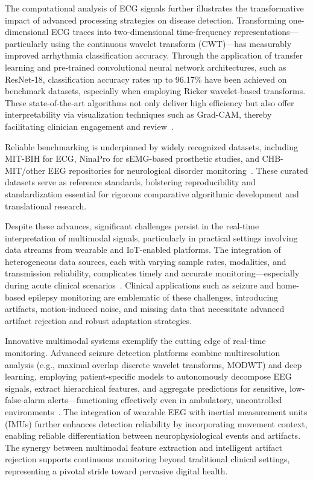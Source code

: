 \documentclass[11pt]{article}
\begin{document}
The computational analysis of ECG signals further illustrates the transformative impact of advanced processing strategies on disease detection. Transforming one-dimensional ECG traces into two-dimensional time-frequency representations—particularly using the continuous wavelet transform (CWT)—has measurably improved arrhythmia classification accuracy. Through the application of transfer learning and pre-trained convolutional neural network architectures, such as ResNet-18, classification accuracy rates up to 96.17\% have been achieved on benchmark datasets, especially when employing Ricker wavelet-based transforms. These state-of-the-art algorithms not only deliver high efficiency but also offer interpretability via visualization techniques such as Grad-CAM, thereby facilitating clinician engagement and review~\cite{ref101}.

Reliable benchmarking is underpinned by widely recognized datasets, including MIT-BIH for ECG, NinaPro for sEMG-based prosthetic studies, and CHB-MIT/other EEG repositories for neurological disorder monitoring~\cite{ref96,ref97,ref101}. These curated datasets serve as reference standards, bolstering reproducibility and standardization essential for rigorous comparative algorithmic development and translational research.

Despite these advances, significant challenges persist in the real-time interpretation of multimodal signals, particularly in practical settings involving data streams from wearable and IoT-enabled platforms. The integration of heterogeneous data sources, each with varying sample rates, modalities, and transmission reliability, complicates timely and accurate monitoring—especially during acute clinical scenarios~\cite{ref98,ref102,ref106,ref107}. Clinical applications such as seizure and home-based epilepsy monitoring are emblematic of these challenges, introducing artifacts, motion-induced noise, and missing data that necessitate advanced artifact rejection and robust adaptation strategies.

Innovative multimodal systems exemplify the cutting edge of real-time monitoring. Advanced seizure detection platforms combine multiresolution analysis (e.g., maximal overlap discrete wavelet transforms, MODWT) and deep learning, employing patient-specific models to autonomously decompose EEG signals, extract hierarchical features, and aggregate predictions for sensitive, low-false-alarm alerts—functioning effectively even in ambulatory, uncontrolled environments~\cite{ref98,ref102,ref103}. The integration of wearable EEG with inertial measurement units (IMUs) further enhances detection reliability by incorporating movement context, enabling reliable differentiation between neurophysiological events and artifacts. The synergy between multimodal feature extraction and intelligent artifact rejection supports continuous monitoring beyond traditional clinical settings, representing a pivotal stride toward pervasive digital health.
\end{document}
